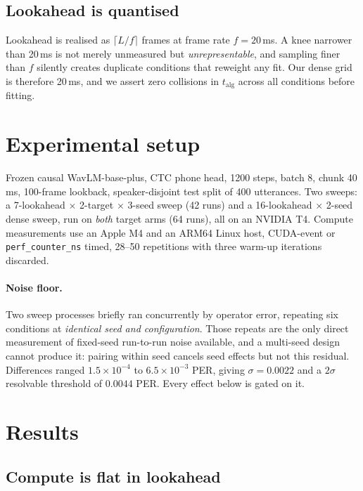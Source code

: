 \documentclass[9pt,a4paper,twocolumn]{article}
\begin{document}
\subsection{Lookahead is quantised}

Lookahead is realised as $\lceil L/f \rceil$ frames at frame rate $f=20$\,ms.
A knee narrower than 20\,ms is not merely unmeasured but
\emph{unrepresentable}, and sampling finer than $f$ silently creates duplicate
conditions that reweight any fit. Our dense grid is therefore 20\,ms, and we
assert zero collisions in $t_{\mathrm{alg}}$ across all conditions before
fitting.

\section{Experimental setup}

Frozen causal WavLM-base-plus, CTC phone head, 1200 steps, batch 8, chunk
40\,ms, 100-frame lookback, speaker-disjoint test split of 400 utterances.
Two sweeps: a 7-lookahead $\times$ 2-target $\times$ 3-seed sweep (42 runs)
and a 16-lookahead $\times$ 2-seed dense sweep, run on \emph{both} target arms
(64 runs), all on an NVIDIA T4. Compute measurements use an Apple M4 and an ARM64
Linux host, CUDA-event or \texttt{perf\_counter\_ns} timed, 28--50 repetitions
with three warm-up iterations discarded.

\paragraph{Noise floor.} Two sweep processes briefly ran concurrently by
operator error, repeating six conditions at \emph{identical seed and
configuration}. Those repeats are the only direct measurement of fixed-seed
run-to-run noise available, and a multi-seed design cannot produce it: pairing
within seed cancels seed effects but not this residual. Differences ranged
$1.5\times10^{-4}$ to $6.5\times10^{-3}$ PER, giving $\sigma=0.0022$ and a
$2\sigma$ resolvable threshold of $\mathbf{0.0044}$ PER. Every effect below is
gated on it.

\section{Results}

\subsection{Compute is flat in lookahead}
\label{sec:compute}
\end{document}
